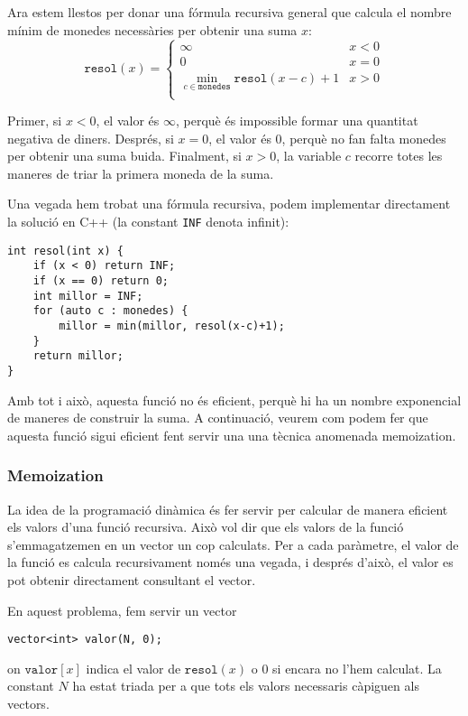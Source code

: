 Ara estem llestos per donar una fórmula recursiva general
que calcula el nombre mínim de
monedes necessàries per obtenir una suma $x$:
\begin{equation*}
    \texttt{resol}(x) = \begin{cases}
               \infty & x < 0\\
               0 & x = 0\\
               \min_{c \in \texttt{monedes}} \texttt{resol}(x-c)+1 & x > 0 \\
           \end{cases}
\end{equation*}

Primer, si $x<0$, el valor és $\infty$,
perquè és impossible formar una quantitat negativa
de diners.
Després, si $x=0$, el valor és $0$,
perquè no fan falta monedes per obtenir una suma buida.
Finalment, si $x>0$, la variable $c$
recorre totes les maneres de triar la primera moneda
de la suma.

Una vegada hem trobat una fórmula recursiva,
podem implementar directament la solució en C++
(la constant \texttt{INF} denota infinit):

\begin{lstlisting}
int resol(int x) {
    if (x < 0) return INF;
    if (x == 0) return 0;
    int millor = INF;
    for (auto c : monedes) {
        millor = min(millor, resol(x-c)+1);
    }
    return millor;
}
\end{lstlisting}

Amb tot i això, aquesta funció no és eficient,
perquè hi ha un nombre exponencial de maneres
de construir la suma.
A continuació, veurem com podem fer que aquesta
funció sigui eficient fent servir una una tècnica
anomenada memoization.

\subsubsection{Memoization}


La idea de la programació dinàmica és fer servir
 per calcular de manera eficient
els valors d'una funció recursiva.
Això vol dir que els valors de la funció
s'emmagatzemen en un vector un cop calculats.
Per a cada paràmetre, el valor de la funció
es calcula recursivament només una vegada, i després d'això,
el valor es pot obtenir directament consultant el vector.

En aquest problema, fem servir un vector
\begin{lstlisting}
vector<int> valor(N, 0);
\end{lstlisting}
on $\texttt{valor}[x]$
indica el valor de $\texttt{resol}(x)$ o $0$
si encara no l'hem calculat.
La constant $N$ ha estat triada per a que tots els valors
necessaris càpiguen als vectors.


